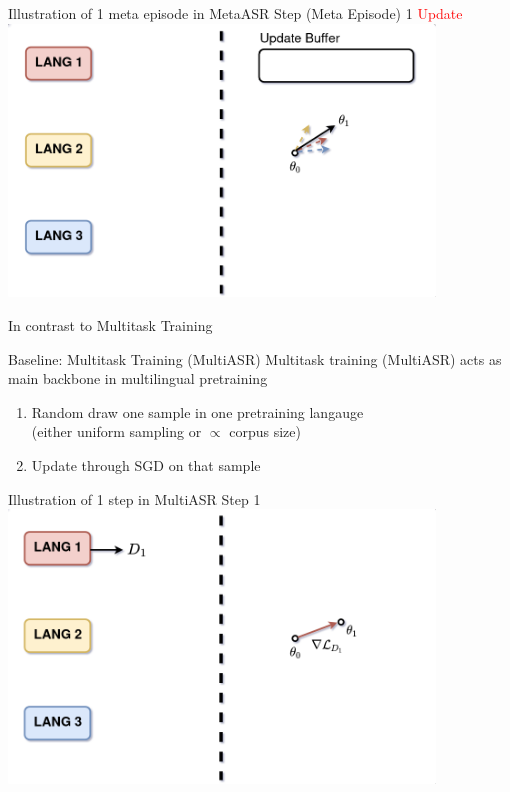 \documentclass{beamer}
\begin{document}
\begin{frame}[t]{Illustration of 1 meta episode in MetaASR}
  Step (Meta Episode) 1 \textcolor{red}{Update}
  \center \includegraphics[width=0.85\textwidth]{fig/meta_update.png}
\end{frame}

\begin{frame}
	\begin{center}
    \LARGE{In contrast to Multitask Training}
	\end{center}
\end{frame}

\begin{frame}[t]{Baseline: Multitask Training (MultiASR)}
  Multitask training (MultiASR) acts as main backbone in multilingual pretraining
  \vspace{2em}
  \begin{enumerate}
    \item Random draw one sample in one pretraining langauge \\ (either uniform sampling or $\propto$ corpus size)
    \item Update through SGD on that sample
  \end{enumerate}
\end{frame}

\begin{frame}[t]{Illustration of 1 step in MultiASR}
  Step 1 
  \center \includegraphics[width=0.85\textwidth]{fig/multi_step1.png}
\end{frame}
\end{document}
